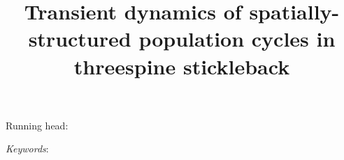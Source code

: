 \documentclass[11pt]{article}
\title{Transient dynamics of spatially-structured population cycles 
in threespine stickleback}
\begin{document}
\raggedright
\setlength\parindent{0.25in}

\maketitle


% 
% 



\bigskip

Running head: {}

\linenumbers{}

\clearpage








\bigskip

\textit{Keywords}: {}


















\end{document}
